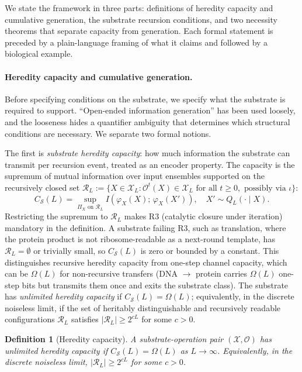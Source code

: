 \documentclass[aps,prx,reprint,amsmath,amssymb,floatfix,superscriptaddress,nofootinbib]{revtex4-2}
\theoremstyle{plain-thm}
\theoremstyle{definition-thm}
\newtheorem{definition}{Definition}
\newcommand{\Csub}{C_{\mathcal{S}}}
\newcommand{\descX}{\varphi_X}
\newcommand{\Xset}{\mathcal{X}}
\newcommand{\Op}{\mathcal{O}}
\newcommand{\Reach}{\mathcal{R}}
\begin{document}
We state the framework in three parts: definitions of heredity capacity and cumulative generation, the substrate recursion conditions, and two necessity theorems that separate capacity from generation. Each formal statement is preceded by a plain-language framing of what it claims and followed by a biological example.

\paragraph{Heredity capacity and cumulative generation.}

Before specifying conditions on the substrate, we specify what the substrate is required to support. ``Open-ended information generation'' has been used loosely, and the looseness hides a quantifier ambiguity that determines which structural conditions are necessary. We separate two formal notions.

The first is \emph{substrate heredity capacity}: how much information the substrate can transmit per recursion event, treated as an encoder property. The capacity is the supremum of mutual information over input ensembles supported on the recursively closed set $\mathcal{R}_L := \{X \in \Xset_L : \Op^t(X) \in \Xset_L \text{ for all } t \ge 0, \text{ possibly via } \iota\}$:
\begin{equation}
\Csub(L) = \sup_{\Pi_X \text{ on } \mathcal{R}_L} I\!\left(\descX(X);\, \descX(X')\right), \quad X' \sim Q_L(\cdot \mid X).
\label{eq:capacity}
\end{equation}
Restricting the supremum to $\mathcal{R}_L$ makes R3 (catalytic closure under iteration) mandatory in the definition. A substrate failing R3, such as translation, where the protein product is not ribosome-readable as a next-round template, has $\mathcal{R}_L = \emptyset$ or trivially small, so $\Csub(L)$ is zero or bounded by a constant. This distinguishes recursive heredity capacity from one-step channel capacity, which can be $\Omega(L)$ for non-recursive transfers (DNA $\to$ protein carries $\Omega(L)$ one-step bits but transmits them once and exits the substrate class). The substrate has \emph{unlimited heredity capacity} if $\Csub(L) = \Omega(L)$; equivalently, in the discrete noiseless limit, if the set of heritably distinguishable and recursively readable configurations $\Reach_L$ satisfies $|\Reach_L| \ge 2^{cL}$ for some $c > 0$.

\begin{definition}[Heredity capacity]
\label{def:capacity}
A substrate-operation pair $(\Xset, \Op)$ has \textnormal{unlimited heredity capacity} if $\Csub(L) = \Omega(L)$ as $L \to \infty$. Equivalently, in the discrete noiseless limit, $|\Reach_L| \ge 2^{cL}$ for some $c > 0$.
\end{definition}
\end{document}
